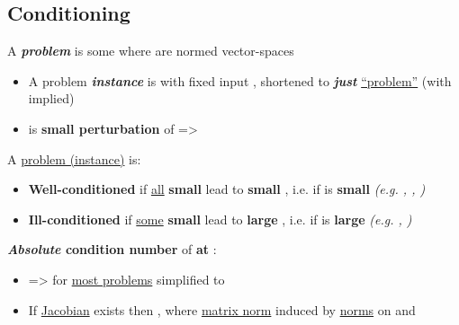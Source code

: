 \subsection*{Conditioning}

A \textbf{\emph{problem}} is some  where 
are normed vector-spaces

\begin{itemize}

      \item
            A problem \textbf{\emph{instance}} is  with fixed input
            , shortened to \textbf{\emph{just}} \underline{``problem''}
            (with  implied)
      \item
             is \textbf{small perturbation} of 
            => 
\end{itemize}

A \underline{problem (instance)} is:
\begin{itemize}

      \item
            \textbf{Well-conditioned} if \underline{all} \textbf{small} 
            lead to \textbf{small} , i.e. if \iMbox{\kappa} is
            \textbf{small} \emph{(e.g. , , )}
      \item
            \textbf{Ill-conditioned} if \underline{some} \textbf{small} 
            lead to \textbf{large} , i.e. if \iMbox{\kappa} is
            \textbf{large} \emph{(e.g. , )}
\end{itemize}

\hSep %

\textbf{\emph{Absolute} condition number} 
of \textbf{ at }:
\begin{itemize}

      \item

            => for \underline{most problems} simplified to
      \item
            If \underline{Jacobian}  exists then ,
            where \underline{matrix norm} \iMbox{\lVert - \rVert} induced by \underline{norms} on  and 
\end{itemize}

